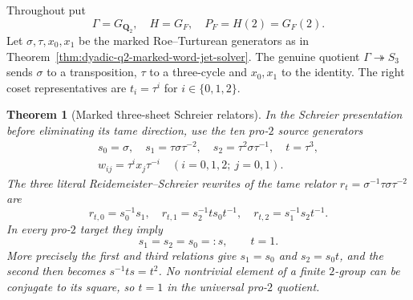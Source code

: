 \documentclass[11pt]{article}
\newtheorem{theorem}{Theorem}[section]
\theoremstyle{definition}
\begin{document}
Throughout put
\[
\Gamma=G_{\mathbf Q_2},\quad
H=G_F,\quad
P_F=H(2)=G_F(2).
\]
Let $\sigma,\tau,x_0,x_1$
be the marked Roe--Turturean
generators as in
Theorem~\ref{thm:dyadic-q2-marked-word-jet-solver}.
The genuine quotient
$\Gamma\twoheadrightarrow S_3$
sends $\sigma$ to a
transposition, $\tau$ to
a three-cycle and
$x_0,x_1$ to the identity.
The right coset representatives
are $t_i=\tau^i$ for
$i\in\{0,1,2\}$.

\begin{theorem}[Marked three-sheet Schreier relators]
\label{thm:dyadic-f133-schreier-pro2-presentation}
In the Schreier presentation
before eliminating its tame
direction, use the ten
pro-$2$ source generators
\begin{equation}\label{eq:dyadic-f133-ten-schreier-generators}
\boxed{
\begin{gathered}
s_0=\sigma,\quad
s_1=\tau\sigma\tau^{-2},
\quad
s_2=\tau^2\sigma\tau^{-1},
\quad t=\tau^3,\\
w_{ij}=\tau^i x_j\tau^{-i}
\quad(i=0,1,2;\ j=0,1).
\end{gathered}}
\end{equation}
The three \emph{literal}
Reidemeister--Schreier
rewrites of the tame
relator
$r_t=\sigma^{-1}\tau\sigma\tau^{-2}$
are
\begin{equation}\label{eq:dyadic-f133-three-tame-relators}
\boxed{
r_{t,0}=s_0^{-1}s_1,\quad
r_{t,1}=s_2^{-1}t s_0t^{-1},
\quad
r_{t,2}=s_1^{-1}s_2t^{-1}.
}
\end{equation}
In every pro-$2$
target they imply
\begin{equation}\label{eq:dyadic-f133-tame-elimination}
\boxed{\qquad
s_1=s_2=s_0=:s,\qquad t=1.
\qquad}
\end{equation}
More precisely the
first and third relations
give $s_1=s_0$ and
$s_2=s_0t$, and
the second then becomes
$s^{-1}ts=t^2$.
No nontrivial element
of a finite $2$-group
can be conjugate to its
square, so $t=1$ in
the universal pro-$2$
quotient.


\end{theorem}
\end{document}
